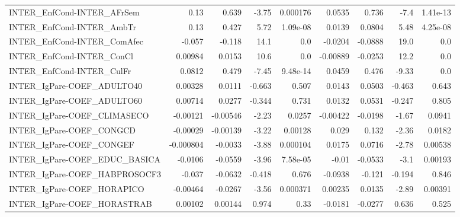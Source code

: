 \begin{tabular}{lrrrrrrrr}
INTER\_EnfCond-INTER\_AFrSem             &        0.13 &        0.639 &    -3.75 & 0.000176 &     0.0535 &       0.736 &         -7.4 &      1.41e-13 \\
INTER\_EnfCond-INTER\_AmbTr              &        0.13 &        0.427 &     5.72 & 1.09e-08 &     0.0139 &      0.0804 &         5.48 &      4.25e-08 \\
INTER\_EnfCond-INTER\_ComAfec            &      -0.057 &       -0.118 &     14.1 &      0.0 &    -0.0204 &     -0.0888 &         19.0 &           0.0 \\
INTER\_EnfCond-INTER\_ConCl              &     0.00984 &       0.0153 &     10.6 &      0.0 &   -0.00889 &     -0.0253 &         12.2 &           0.0 \\
INTER\_EnfCond-INTER\_CulFr              &      0.0812 &        0.479 &    -7.45 & 9.48e-14 &     0.0459 &       0.476 &        -9.33 &           0.0 \\
INTER\_IgPare-COEF\_ADULTO40             &     0.00328 &       0.0111 &   -0.663 &    0.507 &     0.0143 &      0.0503 &       -0.463 &         0.643 \\
INTER\_IgPare-COEF\_ADULTO60             &     0.00714 &       0.0277 &   -0.344 &    0.731 &     0.0132 &      0.0531 &       -0.247 &         0.805 \\
INTER\_IgPare-COEF\_CLIMASECO            &    -0.00121 &     -0.00546 &    -2.23 &   0.0257 &   -0.00422 &     -0.0198 &        -1.67 &        0.0941 \\
INTER\_IgPare-COEF\_CONGCD               &    -0.00029 &     -0.00139 &    -3.22 &  0.00128 &      0.029 &       0.132 &        -2.36 &        0.0182 \\
INTER\_IgPare-COEF\_CONGEF               &   -0.000804 &      -0.0033 &    -3.88 & 0.000104 &     0.0175 &      0.0716 &        -2.78 &       0.00538 \\
INTER\_IgPare-COEF\_EDUC\_BASICA          &     -0.0106 &      -0.0559 &    -3.96 & 7.58e-05 &      -0.01 &     -0.0533 &         -3.1 &       0.00193 \\
INTER\_IgPare-COEF\_HABPROSOCF3          &      -0.037 &      -0.0632 &   -0.418 &    0.676 &    -0.0938 &      -0.121 &       -0.194 &         0.846 \\
INTER\_IgPare-COEF\_HORAPICO             &    -0.00464 &      -0.0267 &    -3.56 & 0.000371 &    0.00235 &      0.0135 &        -2.89 &       0.00391 \\
INTER\_IgPare-COEF\_HORASTRAB            &     0.00102 &      0.00144 &    0.974 &     0.33 &    -0.0181 &     -0.0277 &        0.636 &         0.525 \\

\end{tabular}
